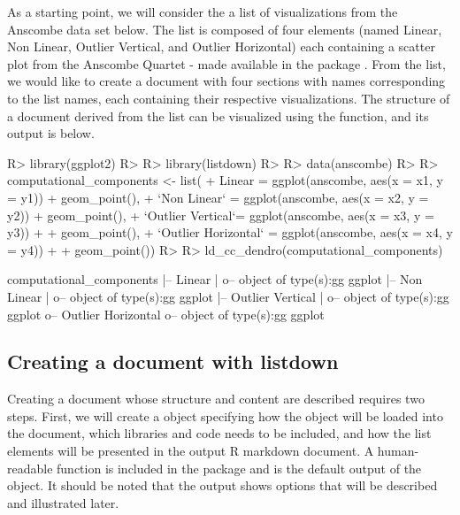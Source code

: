 \documentclass[
]{jss}
\begin{document}
As a starting point, we will consider the a list of visualizations from
the Anscombe data set below. The list is composed of four 
\citep{wickham2016} elements (named Linear, Non Linear, Outlier
Vertical, and Outlier Horizontal) each containing a scatter plot from
the Anscombe Quartet - made available in the  package
\citep{R}. From the  list, we would like
to create a document with four sections with names corresponding to the
list names, each containing their respective visualizations. The
structure of a document derived from the 
list can be visualized using the  function, and its
output is below.

\begin{CodeChunk}
\begin{CodeInput}
R> library(ggplot2)
R> 
R> library(listdown)
R> 
R> data(anscombe)
R> 
R> computational_components <- list(
+   Linear = ggplot(anscombe, aes(x = x1, y = y1)) + geom_point(),
+   `Non Linear` = ggplot(anscombe, aes(x = x2, y = y2)) + geom_point(),
+   `Outlier Vertical`= ggplot(anscombe, aes(x = x3, y = y3)) + 
+     geom_point(),
+   `Outlier Horizontal` =  ggplot(anscombe, aes(x = x4, y = y4)) + 
+     geom_point())
R> 
R> ld_cc_dendro(computational_components)
\end{CodeInput}
\begin{CodeOutput}

computational_components
  |-- Linear
  |  o-- object of type(s):gg ggplot
  |-- Non Linear
  |  o-- object of type(s):gg ggplot
  |-- Outlier Vertical
  |  o-- object of type(s):gg ggplot
  o-- Outlier Horizontal
     o-- object of type(s):gg ggplot
\end{CodeOutput}
\end{CodeChunk}

\hypertarget{creating-a-document-with-listdown}{%
\subsection{Creating a document with
listdown}\label{creating-a-document-with-listdown}}

Creating a document whose structure and content are described
 requires two steps. First, we will
create a  object specifying how the \newline
{} object will be loaded into the document,
which libraries and code needs to be included, and how the list elements
will be presented in the output R markdown document. A human-readable
 function is included in the package and is the default
output of the object. It should be noted that the output shows options
that will be described and illustrated later.
\end{document}

